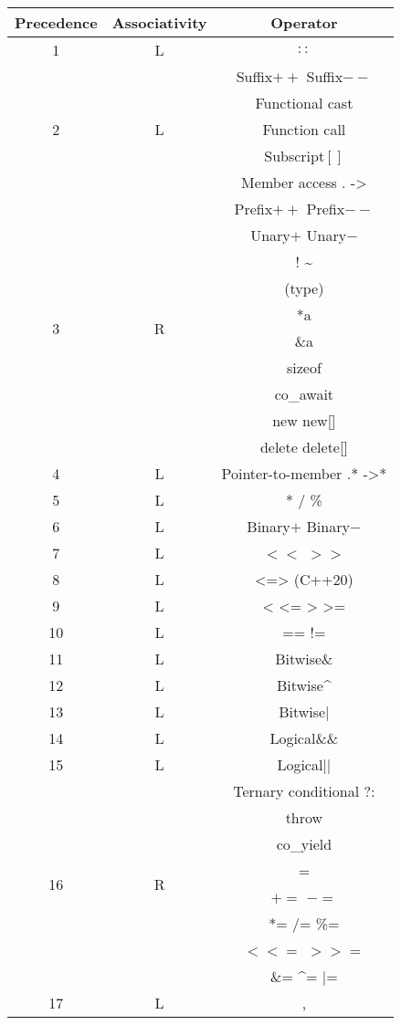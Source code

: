 \begin{longtable}{|c|c|c|}
    \hline
    Precedence & Associativity & Operator\\
    \hline
    1 & L & $ :: $ \\
    \hline
    \multirow{5}{*}{2} & \multirow{5}{*}{L} & Suffix$ ++ $ Suffix$ -- $ \\
    && Functional cast \\
    && Function call \\
    && Subscript$ [] $ \\
    && Member access . -> \\
    \hline
    \multirow{10}{*}{3} & \multirow{10}{*}{R} & Prefix$ ++ $ Prefix$ -- $ \\
    && Unary$ + $ Unary$ - $ \\
    && ! \~{} \\
    && (type) \\
    && *a \\
    && \&a \\
    && sizeof \\
    && co\_await \\
    && new new[] \\
    && delete delete[] \\
    \hline
    4 & L & Pointer-to-member .* ->* \\
    \hline
    5 & L & * / \% \\
    \hline
    6 & L & Binary$ + $ Binary$ - $ \\
    \hline
    7 & L & $<<$ $>>$ \\
    \hline
    8 & L & <=> (C++20) \\
    \hline
    9 & L & < <= > >= \\
    \hline
    10 & L & == != \\
    \hline
    11 & L & Bitwise\& \\
    \hline
    12 & L & Bitwise\^{} \\
    \hline
    13 & L & Bitwise| \\
    \hline
    14 & L & Logical\&\& \\
    \hline
    15 & L & Logical|| \\
    \hline
    \multirow{8}{*}{16} & \multirow{8}{*}{R} & Ternary conditional ?: \\
    && throw \\
    && co\_yield \\
    && = \\
    && $ += $ $ -= $ \\
    && *= /= \%= \\
    && $<<=$ $>>=$ \\
    && \&= \^{}= |= \\
    \hline
    17 & L & , \\
    \hline
\end{longtable}
